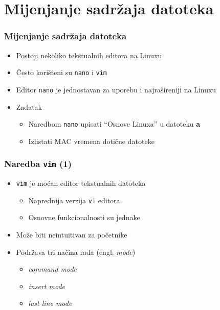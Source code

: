 \documentclass{beamer}
\newcommand{\shell}[1]{\texttt{#1}}
\begin{document}
\section{Mijenjanje sadržaja datoteka}
\begin{frame}[t]
\frametitle{Mijenjanje sadržaja datoteka}
\begin{itemize}
  \item Postoji nekoliko tekstualnih editora na Linuxu 
  \item Često korišteni su \shell{nano} i \shell{vim}
  \item Editor \shell{nano} je jednostavan za uporebu i najrašireniji 
        na Linuxu
  \item Zadatak
  \begin{itemize}
    \item Naredbom \shell{nano} upisati “Osnove Linuxa” u datoteku 
          \textbf{a}
    \item Izlistati MAC vremena dotične datoteke
  \end{itemize}
\end{itemize}
\end{frame}

\begin{frame}[t]
\frametitle{Naredba \shell{vim} (1)}
\begin{itemize}
  \item \shell{vim} je moćan editor tekstualnih datoteka
  \begin{itemize}
    \item Naprednija verzija \shell{vi} editora
    \item Osnovne funkcionalnosti su jednake
  \end{itemize}
  \item Može biti neintuitivan za početnike
  \item Podržava tri načina rada (engl. \emph{mode})
  \begin{itemize}
    \item \emph{command mode}
    \item \emph{insert mode}
    \item \emph{last line mode}
  \end{itemize}
\end{itemize}
\end{frame}
\end{document}
